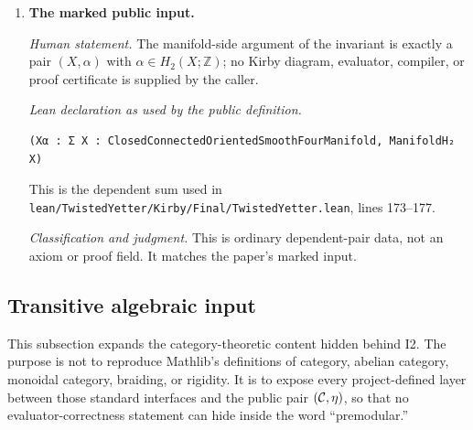 \begin{enumerate}[label=\textbf{I\arabic*.},leftmargin=*]
\emph{Lean declarations.}
\begin{verbatim}
noncomputable def ManifoldH₂
    (X : ClosedConnectedOrientedSmoothFourManifold) : AddCommGrpCat :=
  integralSingularH₂Functor.obj (underlyingTopologicalSpace X)

noncomputable def inducedH₂
    {X Y : ClosedConnectedOrientedSmoothFourManifold}
    (f : OrientedDiffeomorphism X Y) :
    ManifoldH₂ X ≃+ ManifoldH₂ Y :=
  CategoryTheory.Iso.addCommGroupIsoToAddEquiv
    (integralSingularH₂Functor.mapIso (underlyingHomeomorphism f))
\end{verbatim}
The source is \nolinkurl{EntranceAxioms.lean}, lines 350--366.

\emph{Classification and judgment.}
These are derived noncomputable definitions, not new axioms.  They use
Mathlib's integral singular-homology functor and the explicitly supplied
underlying homeomorphism.  This matches the paper's $H_2(X;\mathbb Z)$ input.

\item \textbf{The marked public input.}

\emph{Human statement.}
The manifold-side argument of the invariant is exactly a pair
$(X,\alpha)$ with
$\alpha\in H_2(X;\mathbb Z)$; no Kirby diagram, evaluator, compiler, or proof
certificate is supplied by the caller.

\emph{Lean declaration as used by the public definition.}
\begin{verbatim}
(Xα : Σ X : ClosedConnectedOrientedSmoothFourManifold, ManifoldH₂ X)
\end{verbatim}
This is the dependent sum used in
\nolinkurl{lean/TwistedYetter/Kirby/Final/TwistedYetter.lean}, lines 173--177.

\emph{Classification and judgment.}
This is ordinary dependent-pair data, not an axiom or proof field.  It matches
the paper's marked input.

\end{enumerate}

\subsection{Transitive algebraic input}
\label{app:lean-category-input}

This subsection expands the category-theoretic content hidden behind I2.  The
purpose is not to reproduce Mathlib's definitions of category, abelian
category, monoidal category, braiding, or rigidity.  It is to expose every
project-defined layer between those standard interfaces and the public pair
$(\mathcal{C},\eta)$, so that no evaluator-correctness statement can hide inside the
word ``premodular.''

